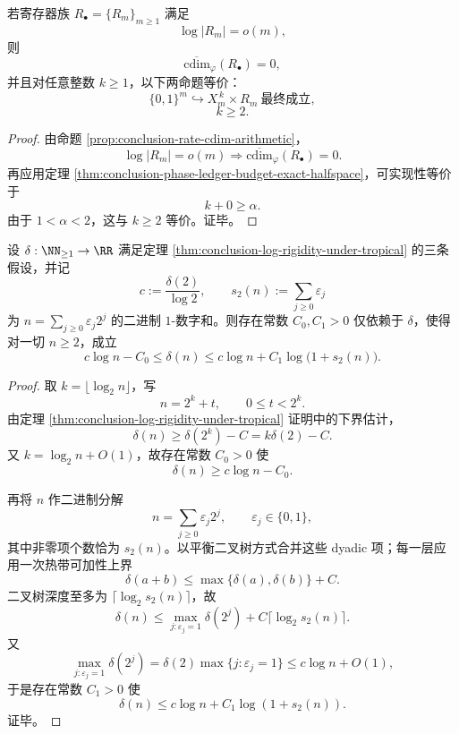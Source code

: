 \begin{theorem}[次指数账本族的相位普适性]\label{thm:conclusion-subexponential-ledger-phase-universality}
若寄存器族 \(R_\bullet=\{R_m\}_{m\ge 1}\) 满足
\[
\log |R_m|=o(m),
\]
则
\[
\overline{\mathrm{cdim}}_{\varphi}(R_\bullet)=0,
\]
并且对任意整数 \(k\ge 1\)，以下两命题等价：
\[
\{0,1\}^m\hookrightarrow X_m^{\,k}\times R_m\ \text{最终成立},
\]
\[
k\ge 2.
\]
\end{theorem}
\begin{proof}
由命题 \ref{prop:conclusion-rate-cdim-arithmetic}，
\[
\log|R_m|=o(m)\Longrightarrow \overline{\mathrm{cdim}}_{\varphi}(R_\bullet)=0.
\]
再应用定理 \ref{thm:conclusion-phase-ledger-budget-exact-halfspace}，可实现性等价于
\[
k+0\ge \alpha.
\]
由于 \(1<\alpha<2\)，这与 \(k\ge 2\) 等价。证毕。
\end{proof}

\begin{theorem}[二进稀疏度控制的对数偏差界]\label{thm:conclusion-binary-sparsity-logarithmic-deviation}
设 \(\delta:\NN_{\ge 1}\to \RR\) 满足定理 \ref{thm:conclusion-log-rigidity-under-tropical} 的三条假设，并记
\[
c:=\frac{\delta(2)}{\log 2},
\qquad
s_2(n):=\sum_{j\ge 0}\varepsilon_j
\]
为 \(n=\sum_{j\ge 0}\varepsilon_j2^j\) 的二进制 \(1\)-数字和。则存在常数 \(C_0,C_1>0\) 仅依赖于 \(\delta\)，使得对一切 \(n\ge 2\)，成立
\[
c\log n-C_0
\le
\delta(n)
\le
c\log n+C_1\log\!\bigl(1+s_2(n)\bigr).
\]
\end{theorem}
\begin{proof}
取 \(k=\lfloor \log_2 n\rfloor\)，写
\[
n=2^k+t,
\qquad
0\le t<2^k.
\]
由定理 \ref{thm:conclusion-log-rigidity-under-tropical} 证明中的下界估计，
\[
\delta(n)\ge \delta(2^k)-C=k\delta(2)-C.
\]
又 \(k=\log_2 n+O(1)\)，故存在常数 \(C_0>0\) 使
\[
\delta(n)\ge c\log n-C_0.
\]

再将 \(n\) 作二进制分解
\[
n=\sum_{j\ge 0}\varepsilon_j2^j,
\qquad
\varepsilon_j\in\{0,1\},
\]
其中非零项个数恰为 \(s_2(n)\)。以平衡二叉树方式合并这些 dyadic 项；每一层应用一次热带可加性上界
\[
\delta(a+b)\le \max\{\delta(a),\delta(b)\}+C.
\]
二叉树深度至多为 \(\lceil \log_2 s_2(n)\rceil\)，故
\[
\delta(n)
\le
\max_{j:\varepsilon_j=1}\delta(2^j)+C\lceil \log_2 s_2(n)\rceil.
\]
又
\[
\max_{j:\varepsilon_j=1}\delta(2^j)
=
\delta(2)\max\{j:\varepsilon_j=1\}
\le
c\log n+O(1),
\]
于是存在常数 \(C_1>0\) 使
\[
\delta(n)\le c\log n+C_1\log(1+s_2(n)).
\]
证毕。
\end{proof}

